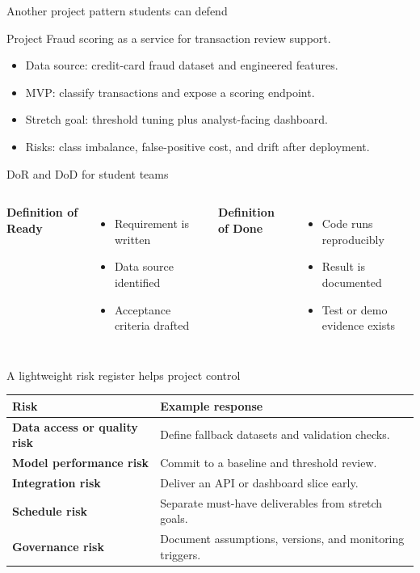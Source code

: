 \begin{frame}{Another project pattern students can defend}
\begin{block}{Project}
Fraud scoring as a service for transaction review support.
\end{block}
\begin{itemize}
\item Data source: credit-card fraud dataset and engineered features.
\item MVP: classify transactions and expose a scoring endpoint.
\item Stretch goal: threshold tuning plus analyst-facing dashboard.
\item Risks: class imbalance, false-positive cost, and drift after deployment.
\end{itemize}
\coursefooter
\end{frame}

\begin{frame}{DoR and DoD for student teams}
\begin{columns}[T]
\textbf{Definition of Ready}
\begin{itemize}
\item Requirement is written
\item Data source identified
\item Acceptance criteria drafted
\end{itemize}
\textbf{Definition of Done}
\begin{itemize}
\item Code runs reproducibly
\item Result is documented
\item Test or demo evidence exists
\end{itemize}
\end{columns}
\coursefooter
\end{frame}

\begin{frame}{A lightweight risk register helps project control}
\begin{tabularx}{\textwidth}{>{\bfseries}l X}
Risk & Example response \\
\toprule
Data access or quality risk & Define fallback datasets and validation checks. \\
Model performance risk & Commit to a baseline and threshold review. \\
Integration risk & Deliver an API or dashboard slice early. \\
Schedule risk & Separate must-have deliverables from stretch goals. \\
Governance risk & Document assumptions, versions, and monitoring triggers. \\
\bottomrule
\end{tabularx}
\coursefooter
\end{frame}


